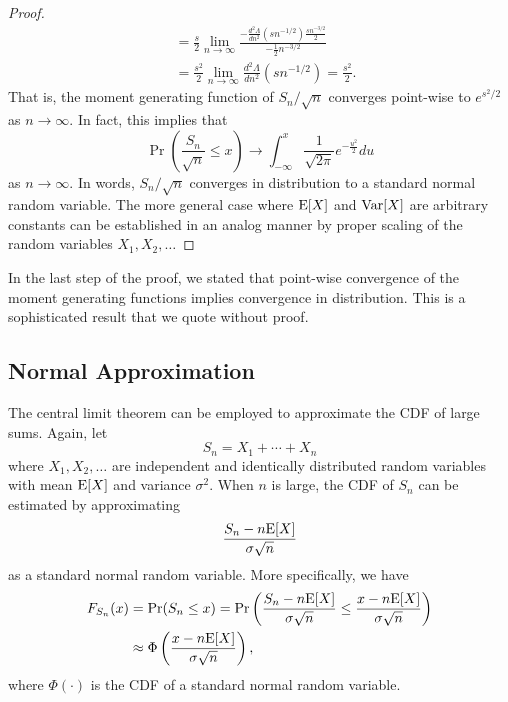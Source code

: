 \begin{proof}
\begin{equation*}
\begin{split}
&= \frac{s}{2} \lim_{n \rightarrow \infty}
\frac{-\frac{d^2 \Lambda}{dn^2} \left( s n^{-1/2} \right) \frac{s n^{-3/2}}{2}}{-\frac{1}{2}n^{-3/2}} \\
&= \frac{s^2}{2} \lim_{n \rightarrow \infty}
\frac{d^2 \Lambda}{dn^2} \left( s n^{-1/2} \right) = \frac{s^2}{2} .
\end{split}
\end{equation*}
That is, the moment generating function of $S_n / \sqrt{n}$ converges point-wise to $e^{s^2/2}$ as $n \rightarrow \infty$.
In fact, this implies that
\begin{equation*}
\Pr \left( \frac{S_n}{\sqrt{n}} \leq x \right) \rightarrow \int_{-\infty}^x \frac{1}{\sqrt{2 \pi}} e^{-\frac{u^2}{2}} du
\end{equation*}
as $n \rightarrow \infty$.
In words, $S_n / \sqrt{n}$ converges in distribution to a standard normal random variable.
The more general case where $\mathrm{E} [X]$ and $\mathrm{Var} [X]$ are arbitrary constants can be established in an analog manner by proper scaling of the random variables $X_1, X_2, \ldots$
\end{proof}

In the last step of the proof, we stated that point-wise convergence of the moment generating functions implies convergence in distribution.
This is a sophisticated result that we quote without proof.


\subsection{Normal Approximation}

The central limit theorem can be employed to approximate the CDF of large sums.
Again, let
\begin{equation*}
S_n = X_1 + \cdots + X_n
\end{equation*}
where $X_1, X_2, \ldots$ are independent and identically distributed random variables with mean $\mathrm{E} [X]$ and variance $\sigma^2$.
When $n$ is large, the CDF of $S_n$ can be estimated by approximating
\begin{equation*}
\frac{ S_n - n \mathrm{E} [X] } { \sigma \sqrt{n} }
\end{equation*}
as a standard normal random variable.
More specifically, we have
\begin{equation*}
\begin{split}
F_{S_n} (x) 
&= \Pr (S_n \leq x)
= \Pr \left( \frac{ S_n - n \mathrm{E} [X] }{ \sigma \sqrt{n} }
\leq \frac{x - n \mathrm{E} [X]}{\sigma \sqrt{n}} \right) \\
&\approx \Phi \left( \frac{x - n \mathrm{E} [X]}{\sigma \sqrt{n}} \right) ,
\end{split}
\end{equation*}
where $\Phi (\cdot)$ is the CDF of a standard normal random variable.


